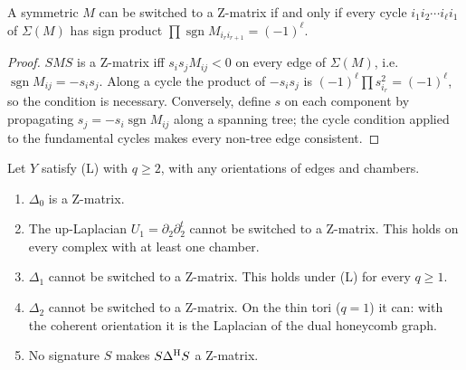 \begin{lemma}\label{V3P2:lem:switch}
A symmetric $M$ can be switched to a Z-matrix if and only if every cycle
$i_1i_2\cdots i_\ell i_1$ of $\Sigma(M)$ has sign product
$\prod\operatorname{sgn}M_{i_ri_{r+1}}=(-1)^{\ell}$.
\end{lemma}

\begin{proof}
$SMS$ is a Z-matrix iff $s_is_jM_{ij}<0$ on every edge of $\Sigma(M)$, i.e.\
$\operatorname{sgn}M_{ij}=-s_is_j$. Along a cycle the product of $-s_is_j$ is
$(-1)^{\ell}\prod s_{i_r}^{2}=(-1)^{\ell}$, so the condition is necessary. Conversely, define
$s$ on each component by propagating $s_j=-s_i\operatorname{sgn}M_{ij}$ along a spanning
tree; the cycle condition applied to the fundamental cycles makes every non-tree edge
consistent.
\end{proof}

\begin{theorem}\label{V3P2:thm:sign}
Let $Y$ satisfy \textup{(L)} with $q\ge2$, with any orientations of edges and chambers.
\begin{enumerate}
\item[(i)] $\Delta_0$ is a Z-matrix.
\item[(ii)] The up-Laplacian $U_1=\partial_2\partial_2^{t}$ cannot be switched to a Z-matrix.
This holds on every complex with at least one chamber.
\item[(iii)] $\Delta_1$ cannot be switched to a Z-matrix. This holds under \textup{(L)} for
every $q\ge1$.
\item[(iv)] $\Delta_2$ cannot be switched to a Z-matrix. On the thin tori ($q=1$) it can: with
the coherent orientation it is the Laplacian of the dual honeycomb graph.
\item[(v)] No signature $S$ makes $S\Delta^{\mathrm{H}} S$ a Z-matrix.
\end{enumerate}
\end{theorem}

